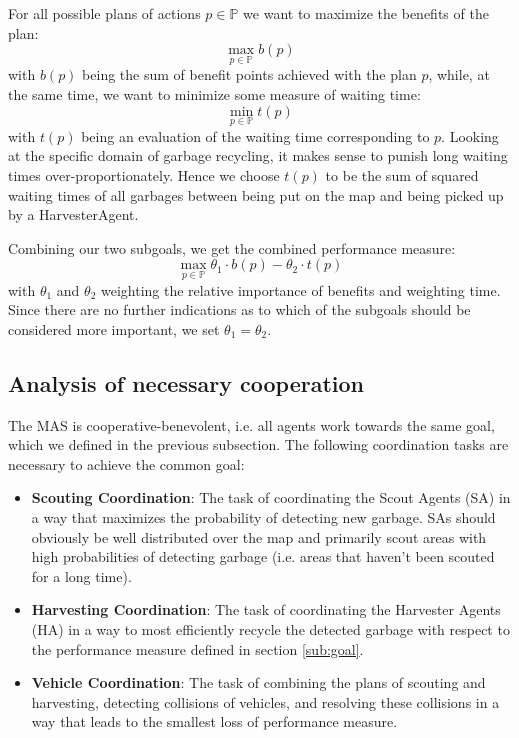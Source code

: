 For all possible plans of actions $ p \in \mathbb{P} $ we want to maximize the benefits of the plan: \[ \max_{p \in \mathbb{P}} b(p)\] with $ b(p) $ being the sum of benefit points achieved with the plan $p$, while, at the same time, we want to minimize some measure of waiting time: \[ \min_{p \in \mathbb{P}} t(p)\] with $t(p)$ being an evaluation of the waiting time corresponding to $p$. Looking at the specific domain of garbage recycling, it makes sense to punish long waiting times over-proportionately. Hence we choose $ t(p) $ to be the sum of squared waiting times of all garbages between being put on the map and being picked up by a HarvesterAgent.

Combining our two subgoals, we get the combined performance measure: \[ \max_{p \in \mathbb{P}} \theta_1 \cdot b(p) - \theta_2 \cdot t(p)\] with $ \theta_1 $ and $ \theta_2 $ weighting the relative importance of benefits and weighting time. Since there are no further indications as to which of the subgoals should be considered more important, we set $\theta_1 = \theta_2$.

\subsection{Analysis of necessary cooperation}
\label{sub:coop}

The MAS is cooperative-benevolent, i.e. all agents work towards the same goal, which we defined in the previous subsection. The following coordination tasks are necessary to achieve the common goal:


\begin{itemize}
	\item \textbf{Scouting Coordination}: The task of coordinating the Scout Agents (SA) in a way that maximizes the probability of detecting new garbage. SAs should obviously be well distributed over the map and primarily scout areas with high probabilities of detecting garbage (i.e. areas that haven't been scouted for a long time). 
	\item \textbf{Harvesting Coordination}: The task of coordinating the Harvester Agents (HA) in a way to most efficiently recycle the detected garbage with respect to the performance measure defined in section \ref{sub:goal}.
	\item \textbf{Vehicle Coordination}: The task of combining the plans of scouting and harvesting, detecting collisions of vehicles, and resolving these collisions in a way that leads to the smallest loss of performance measure.
\end{itemize}